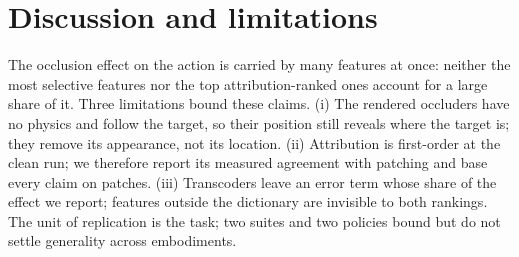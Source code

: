 \documentclass{article}
\begin{document}
\begin{table}[t]
\centering\small
\caption{The same question under three protocols. v1: in-sample pilot; v2: held-out selectivity study; v3: this paper.}
\label{tab:versions}
\end{table}

\section{Discussion and limitations}
The occlusion effect on the action is carried by many features at once: neither the most selective features nor the top attribution-ranked ones account for a large share of it. Three limitations bound these claims. (i) The rendered occluders have no physics and follow the target, so their position still
reveals where the target is; they remove its appearance, not its location. (ii) Attribution is first-order at the clean run; we therefore
report its measured agreement with patching and base every claim on patches. (iii) Transcoders leave an error term whose share of the effect
we report; features outside the dictionary are invisible to both rankings. The unit of replication is the task; two suites and two policies
bound but do not settle generality across embodiments.
\end{document}
